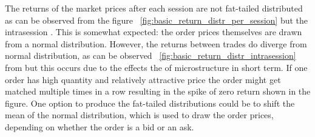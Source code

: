 The returns of the market prices after each session are not fat-tailed distributed as can be observed from the figure 
~\ref{fig:basic_return_distr_per_session} but the intrasession . This is somewhat expected: the order prices themselves are drawn from a normal distribution.
However, the returns between trades do diverge from normal distribution, as can be observed ~\ref{fig:basic_return_distr_intrasession} 
from  but this occurs due to the effects the of microstructure in short term. If one order has high quantity and 
relatively attractive price the order might get matched multiple times in a row resulting in the spike of zero return 
shown in the figure. One option to produce the fat-tailed distributions could be to shift the mean of the normal distribution, 
which is used to draw the order prices, depending on whether the order is a bid or an ask. 



